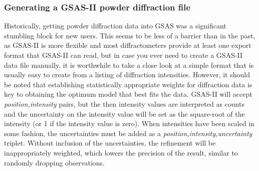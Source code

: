 \subsubsection{Generating a GSAS-II powder diffraction file}
Historically, getting powder diffraction data into GSAS was a significant stumbling block for new users.
This seems to be less of a barrier than in the past, as GSAS-II is more flexible and most diffractometers provide at least one export format that GSAS-II can read, but in case you ever need to create a GSAS-II data file manually, it is worthwhile to take a close look at a simple format that is usually easy to create from a listing of diffraction intensities. However, it should be noted that establishing statistically appropriate weights for diffraction data is key to obtaining the optimum model that best fits the data. GSAS-II will accept \textit{position,intensity} pairs, but the then intensity values are interpreted as counts and the uncertainty on the intensity value will be set as the square-root of the intensity (or 1 if the intensity value is zero). When intensities have been scaled in some fashion, the uncertainties must be added as a \textit{position,intensity,uncertainty} triplet. Without inclusion of the uncertainties, the refinement will be inappropriately weighted, which lowers the precision of the result, similar to randomly dropping observations. 

